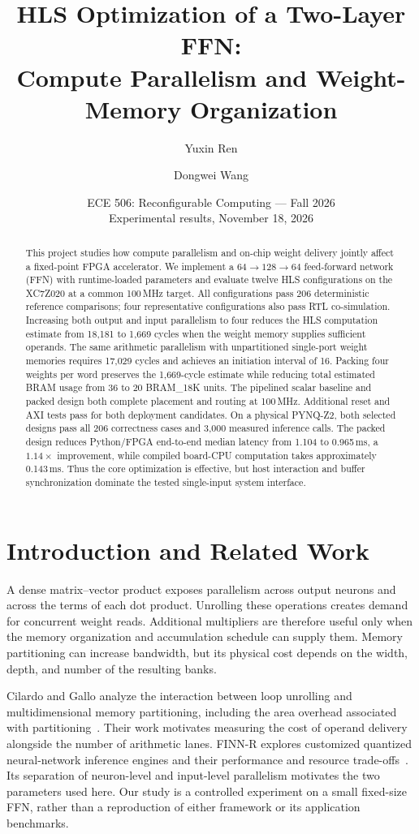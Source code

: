 \documentclass[11pt,letterpaper]{article}
\title{HLS Optimization of a Two-Layer FFN:\\Compute Parallelism and Weight-Memory Organization}
\author{Yuxin Ren \and Dongwei Wang}
\date{ECE 506: Reconfigurable Computing --- Fall 2026\\Experimental results, November 18, 2026}
\begin{document}
\maketitle

\begin{abstract}
This project studies how compute parallelism and on-chip weight delivery jointly
affect a fixed-point FPGA accelerator. We implement a $64\rightarrow128\rightarrow64$
feed-forward network (FFN) with runtime-loaded parameters and evaluate twelve HLS
configurations on the XC7Z020 at a common 100\,MHz target. All configurations pass
206 deterministic reference comparisons; four representative configurations also
pass RTL co-simulation. Increasing both output and input parallelism to four
reduces the HLS computation estimate from 18,181 to 1,669 cycles when the weight
memory supplies sufficient operands. The same arithmetic parallelism with
unpartitioned single-port weight memories requires 17,029 cycles and achieves an
initiation interval of 16. Packing four weights per word preserves the 1,669-cycle
estimate while reducing total estimated BRAM usage from 36 to 20 BRAM\_18K units.
The pipelined scalar baseline and packed design both complete placement and
routing at 100\,MHz. Additional reset and AXI tests pass for both deployment
candidates. On a physical PYNQ-Z2, both selected designs pass all 206
correctness cases and 3,000 measured inference calls. The packed design reduces
Python/FPGA end-to-end median latency from 1.104 to 0.965\,ms, a $1.14\times$
improvement, while compiled board-CPU computation takes approximately
0.143\,ms. Thus the core optimization is effective, but host interaction and
buffer synchronization dominate the tested single-input system interface.
\end{abstract}

\section{Introduction and Related Work}
A dense matrix--vector product exposes parallelism across output neurons and
across the terms of each dot product. Unrolling these operations creates demand
for concurrent weight reads. Additional multipliers are therefore useful only
when the memory organization and accumulation schedule can supply them. Memory
partitioning can increase bandwidth, but its physical cost depends on the width,
depth, and number of the resulting banks.

Cilardo and Gallo analyze the interaction between loop unrolling and
multidimensional memory partitioning, including the area overhead associated
with partitioning~\cite{cilardo2015}. Their work motivates measuring the cost of
operand delivery alongside the number of arithmetic lanes. FINN-R explores
customized quantized neural-network inference engines and their performance and
resource trade-offs~\cite{blott2018}. Its separation of neuron-level and
input-level parallelism motivates the two parameters used here. Our study is a
controlled experiment on a small fixed-size FFN, rather than a reproduction of
either framework or its application benchmarks.
\end{document}
